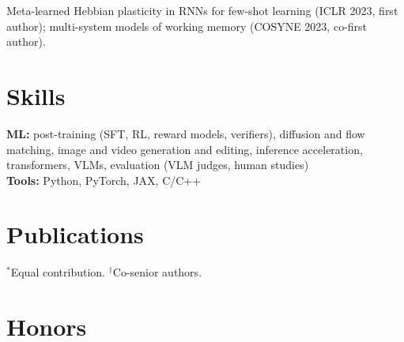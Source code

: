 \documentclass[resume]{clean_cv}
\begin{document}
\begin{bullets}
\item Meta-learned Hebbian plasticity in RNNs for few-shot learning (ICLR 2023, first author); multi-system models of working memory (COSYNE 2023, co-first author).
\end{bullets}

\section{Skills}
\textbf{ML:} post-training (SFT, RL, reward models, verifiers), diffusion and flow matching, image and video generation and editing, inference acceleration, transformers, VLMs, evaluation (VLM judges, human studies) \\
\textbf{Tools:} Python, PyTorch, JAX, C/C++

\section{Publications}
\begin{publist}
\pubSlider
\pubVerify
\pubPOCO
\pubHebbian
\pubCosyneDist
\pubCosyneCausal
\pubNMRNN
\pubWM
\end{publist}
{\small $^*$Equal contribution. $^\dagger$Co-senior authors.}

\section{Honors}
\honorsresume
\end{document}
